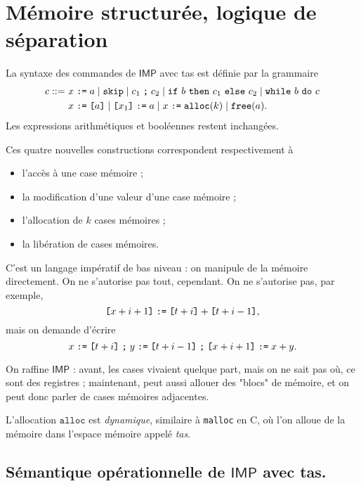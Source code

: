 \documentclass[../main]{subfiles}
\begin{document}
  \chapter{Mémoire structurée, logique de séparation} \label{thprog-chap09}
  \minitoc

  La syntaxe des commandes de $\mathsf{IMP}$ avec tas est définie par la grammaire 
  \begin{align*}
    c ::= \ &x \mathrel{\texttt{:=}} a  \mid \texttt{skip}  \mid c_1 \mathrel{\texttt{;}} c_2  \mid \texttt{if}\ b\ \texttt{then}\ c_1\ \texttt{else}\ c_2  \mid \texttt{while}\ b\ \texttt{do}\ c\\
            &x \mathrel{\texttt{:=}} \text{\texttt{[$a$]}}  \mid \text{\texttt{[$x_1$]}} \mathrel{\texttt{:=}} a  \mid x \mathrel{\texttt{:=}} \texttt{alloc}(k)  \mid \texttt{free}(a).
  \end{align*}
  Les expressions arithmétiques et booléennes restent inchangées.

  Ces quatre nouvelles constructions correspondent respectivement à 
  \begin{itemize}
    \item l'accès à une case mémoire ;
    \item la modification d'une valeur d'une case mémoire ;
    \item l'allocation de $k$ cases mémoires ;
    \item la libération de cases mémoires.
  \end{itemize}

  \begin{rmk}
    C'est un langage impératif de bas niveau : on manipule de la mémoire directement.
    On ne s'autorise pas tout, cependant. On ne s'autorise pas, par exemple, \[
      \text{\texttt{[$x + i + 1$]}} \mathrel{\texttt{:=}} \text{\texttt{[$t + i$]}} + \text{\texttt{[$t + i - 1$]}}
    ,\] mais on demande d'écrire \[
      x \mathrel{\texttt{:=}} \text{\texttt{[$t+i$]}}\mathrel{\texttt{;}} y \mathrel{\texttt{:=}} \text{\texttt{[$t + i - 1$]}} \mathrel{\texttt{;}} \text{\texttt{[$x + i + 1$]}} \mathrel{\texttt{:=}} x + y
    .\]
  \end{rmk}

  On raffine $\mathsf{IMP}$ : avant, les cases vivaient quelque part, mais on ne sait pas où, ce sont des registres ; maintenant, peut aussi allouer des "blocs" de mémoire, et on peut donc parler de cases mémoires adjacentes.

  L'allocation $\mathtt{alloc}$ est \textit{dynamique}, similaire à \texttt{malloc} en C, où l'on alloue de la mémoire dans l'espace mémoire appelé \textit{tas}.

  \section{Sémantique opérationnelle de $\mathsf{IMP}$ avec tas.}
\end{document}
